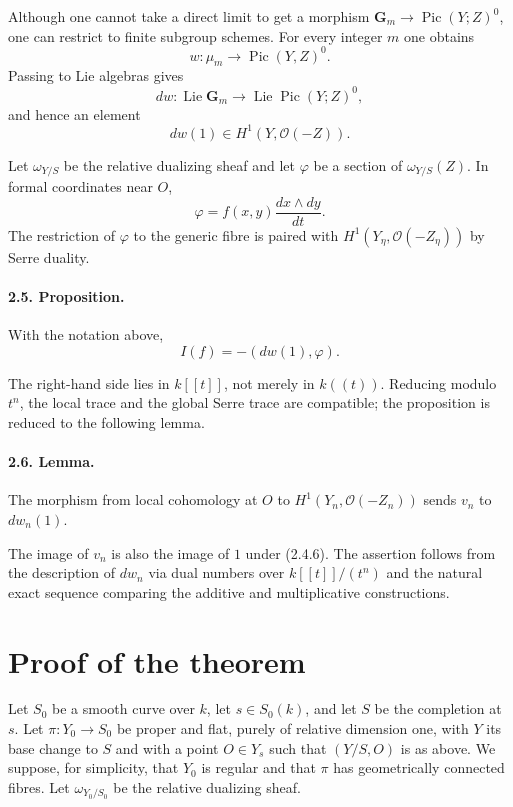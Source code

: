 \documentclass[11pt]{article}
\theoremstyle{remark}
\DeclareMathOperator{\Lie}{Lie}
\DeclareMathOperator{\Pic}{Pic}
\newcommand{\OO}{\mathcal O}
\newcommand{\Gm}{\mathbf G_m}
\begin{document}
Although one cannot take a direct limit to get a morphism $\Gm\to\Pic(Y;Z)^0$, one can restrict to finite subgroup schemes. For every integer $m$ one obtains
\begin{equation}\tag{2.4.9}
 w:\mu_m\longrightarrow\Pic(Y,Z)^0.
\end{equation}
Passing to Lie algebras gives
\begin{equation}\tag{2.4.10}
 dw:\Lie\Gm\longrightarrow\Lie\Pic(Y;Z)^0,
\end{equation}
and hence an element
\begin{equation}\tag{2.4.11}
 dw(1)\in H^1(Y,\OO(-Z)).
\end{equation}

Let $\omega_{Y/S}$ be the relative dualizing sheaf and let $\varphi$ be a section of $\omega_{Y/S}(Z)$. In formal coordinates near $O$,
\[
 \varphi=f(x,y)\frac{dx\wedge dy}{dt}.
\]
The restriction of $\varphi$ to the generic fibre is paired with $H^1(Y_\eta,\OO(-Z_\eta))$ by Serre duality.

\paragraph{2.5. Proposition.}
With the notation above,
\begin{equation}\tag{2.5.1}
 I(f)=-(dw(1),\varphi).
\end{equation}

The right-hand side lies in $k[[t]]$, not merely in $k((t))$. Reducing modulo $t^n$, the local trace and the global Serre trace are compatible; the proposition is reduced to the following lemma.

\paragraph{2.6. Lemma.}
The morphism from local cohomology at $O$ to $H^1(Y_n,\OO(-Z_n))$ sends $v_n$ to $dw_n(1)$.

The image of $v_n$ is also the image of $1$ under (2.4.6). The assertion follows from the description of $dw_n$ via dual numbers over $k[[t]]/(t^n)$ and the natural exact sequence comparing the additive and multiplicative constructions.

\section{Proof of the theorem}

Let $S_0$ be a smooth curve over $k$, let $s\in S_0(k)$, and let $S$ be the completion at $s$. Let $\pi:Y_0\to S_0$ be proper and flat, purely of relative dimension one, with $Y$ its base change to $S$ and with a point $O\in Y_s$ such that $(Y/S,O)$ is as above. We suppose, for simplicity, that $Y_0$ is regular and that $\pi$ has geometrically connected fibres. Let $\omega_{Y_0/S_0}$ be the relative dualizing sheaf.
\end{document}
